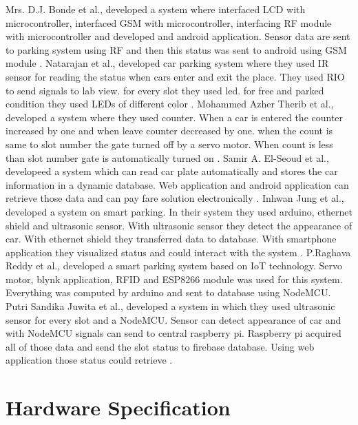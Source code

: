 Mrs. D.J. Bonde et al., developed a system where interfaced LCD with microcontroller, interfaced GSM with microcontroller, interfacing RF module with microcontroller and developed and android application. Sensor data are sent to parking system using RF and then this status was sent to android using GSM module \cite{bonde2014automated}. 
Natarajan et al., developed car parking system where they used IR sensor for reading the status when cars enter and exit the place. They used RIO to send signals to lab view. for every slot they used led. for free and parked condition they used LEDs of different color \cite{natarajan2018design}.
Mohammed Azher Therib et al., developed a system where they used counter. When a car is entered the counter increased by one and when leave counter decreased by one. when the count is same to slot number the gate turned off by a servo motor. When count is less than slot number gate is automatically turned on \cite{doi}. 
Samir A. El-Seoud et al., developeed a system which can read car plate automatically and stores the car information in a dynamic database. Web application and android application can retrieve those data and can pay fare solution electronically \cite{el2016towards}.
\cite{fernando2020innovation}
Inhwan Jung et al., developed a system on smart parking. In their system they used arduino, ethernet shield and ultrasonic sensor. With ultrasonic sensor they detect the appearance of car. With ethernet shield they transferred data to database. With smartphone application they visualized status and could interact with the system \cite{international2018managment}.
P.Raghava Reddy et al., developed a smart parking system based on IoT technology. Servo motor, blynk application, RFID and ESP8266 module was used for this system. Everything was computed by arduino and sent to database using NodeMCU.\cite{khanna2016iot}
Putri Sandika Juwita et al., developed a system in which they used ultrasonic sensor for every slot and a NodeMCU. Sensor can detect appearance of car and with NodeMCU signals can send to central raspberry pi. Raspberry pi acquired all of those data and send the slot status to firebase database. Using web application those status could retrieve \cite{juwita2020smart}.

\section{Hardware Specification}

